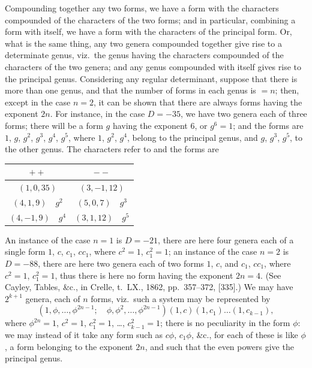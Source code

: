 \documentclass[11pt,a4paper]{book}
\begin{document}
Compounding together any two forms, we have a form with the characters compounded of the characters of the two forms; and in particular, combining a form with itself, we have a form with the characters of the principal form. Or, what is the same thing, any two genera compounded together give rise to a determinate genus, viz.\ the genus having the characters compounded of the characters of the two genera; and any genus compounded with itself gives rise to the principal genus. Considering any regular determinant, suppose that there is more than one genus, and that the number of forms in each genus is $= n$; then, except in the case $n = 2$, it can be shown that there are always forms having the exponent $2n$. For instance, in the case $D = -35$, we have two genera each of three forms; there will be a form $g$ having the exponent 6, or $g^{6} = 1$; and the forms are $1$, $g$, $g^{2}$, $g^{3}$, $g^{4}$, $g^{5}$, where $1$, $g^{2}$, $g^{4}$, belong to the principal genus, and $g$, $g^{3}$, $g^{5}$, to the other genus. The characters refer to and the forms are
\begin{center}
\begin{tabular}{c|c}
$++$ & $--$ \\ \hline
$(1, 0, 35)$ & $(3, -1, 12)$ \\
$(4, 1, 9) \quad g^{2}$ & $(5, 0, 7) \quad g^{3}$ \\
$(4, -1, 9) \quad g^{4}$ & $(3, 1, 12) \quad g^{5}$
\end{tabular}
\end{center}
An instance of the case $n = 1$ is $D = -21$, there are here four genera each of a single form $1$, $c$, $c_{1}$, $cc_{1}$, where $c^{2} = 1$, $c_{1}^{2} = 1$; an instance of the case $n = 2$ is $D = -88$, there are here two genera each of two forms $1$, $c$, and $c_{1}$, $cc_{1}$, where $c^{2} = 1$, $c_{1}^{2} = 1$, thus there is here no form having the exponent $2n = 4$. (See Cayley, Tables, \&c., in Crelle, t.\ LX., 1862, pp.~357--372, [335].) We may have $2^{k+1}$ genera, each of $n$ forms, viz.\ such a system may be represented by
\[
(1, \phi, \ldots, \phi^{2n-1}; \quad \phi, \phi^{2}, \ldots, \phi^{2n-1})(1, c)(1, c_{1}) \ldots (1, c_{k-1}),
\]
where $\phi^{2n} = 1$, $c^{2} = 1$, $c_{1}^{2} = 1$, \ldots, $c_{k-1}^{2} = 1$; there is no peculiarity in the form $\phi$: we may instead of it take any form such as $c\phi$, $c_{1}\phi$, \&c., for each of these is like $\phi$, a form belonging to the exponent $2n$, and such that the even powers give the principal genus.
\end{document}

